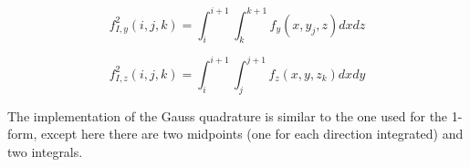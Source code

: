 \documentclass[11pt]{article}
\begin{document}
\begin{equation}
    f_{I,y}^2(i, j, k) = \int _{i} ^ {i+1} \int _{k} ^ {k+1} f_y (x, y_j, z) dx dz
\end{equation}

\begin{equation}
    f_{I,z}^2(i, j, k) = \int _{i} ^ {i+1} \int _{j} ^ {j+1} f_z (x, y, z_k) dx dy
\end{equation}

The implementation of the Gauss quadrature is similar to the one used for the 1-form, except here there are two midpoints (one for each direction integrated) and two integrals.
\end{document}
